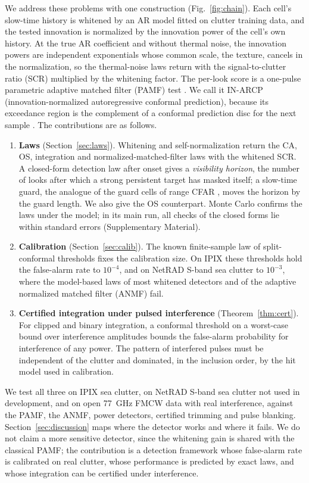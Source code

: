 \documentclass[journal]{IEEEtran}
\begin{document}
We address these problems with one construction (Fig.~\ref{fig:chain}). Each cell's slow-time history is whitened by an AR model fitted on clutter training data, and the tested innovation is normalized by the innovation power of the cell's own history. At the true AR coefficient and without thermal noise, the innovation powers are independent exponentials whose common scale, the texture, cancels in the normalization, so the thermal-noise laws return with the signal-to-clutter ratio (SCR) multiplied by the whitening factor. The per-look score is a one-pulse parametric adaptive matched filter (PAMF) test \cite{roman2000}. We call it IN-ARCP (innovation-normalized autoregressive conformal prediction), because its exceedance region is the complement of a conformal prediction disc for the next sample \cite{lei2018}. The contributions are as follows.
\begin{enumerate}[leftmargin=*,itemsep=2pt]
\item \textbf{Laws} (Section~\ref{sec:laws}). Whitening and self-normalization return the CA, OS, integration and normalized-matched-filter laws with the whitened SCR. A closed-form detection law after onset gives a \emph{visibility horizon}, the number of looks after which a strong persistent target has masked itself; a slow-time guard, the analogue of the guard cells of range CFAR \cite{richards2014}, moves the horizon by the guard length. We also give the OS counterpart. Monte Carlo confirms the laws under the model; in its main run, all \NLawChecks{} checks of the closed forms lie within \LawChecksZBound{} standard errors (Supplementary Material).
\item \textbf{Calibration} (Section~\ref{sec:calib}). The known finite-sample law of split-conformal thresholds \cite{vovk2012} fixes the calibration size. On IPIX these thresholds hold the false-alarm rate to $10^{-4}$, and on NetRAD S-band sea clutter to $10^{-3}$, where the model-based laws of most whitened detectors and of the adaptive normalized matched filter (ANMF) fail.
\item \textbf{Certified integration under pulsed interference} (Theorem~\ref{thm:cert}). For clipped \cite{abbasi2018clip} and binary integration, a conformal threshold on a worst-case bound over interference amplitudes bounds the false-alarm probability for interference of any power. The pattern of interfered pulses must be independent of the clutter and dominated, in the inclusion order, by the hit model used in calibration.
\end{enumerate}
We test all three on IPIX sea clutter, on NetRAD S-band sea clutter not used in development, and on open 77~GHz FMCW data with real interference, against the PAMF, the ANMF, power detectors, certified trimming and pulse blanking. Section~\ref{sec:discussion} maps where the detector works and where it fails. We do not claim a more sensitive detector, since the whitening gain is shared with the classical PAMF; the contribution is a detection framework whose false-alarm rate is calibrated on real clutter, whose performance is predicted by exact laws, and whose integration can be certified under interference.
\end{document}
